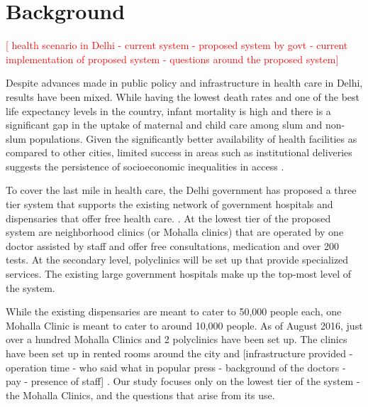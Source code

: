 \section{Background}
\begin{comment}
Build up the context that the reader could read, like a story, to understand more about the problem you’re addressing, the phenomena you are talking about. If the paper is about an internet ban in Bangladesh, tell the story about how the ban was put in place, what was the timeline like, who said what in popular press, and so on. If the research was conducted in the context of an organization of health/outreach workers, talk about the organization, its charter, what it has done/is doing.
\end{comment}

\textcolor{red}{ [
health scenario in Delhi - current system - proposed system by govt - current implementation of proposed system - questions around the proposed system]
}

Despite advances made in public policy and infrastructure in health care in Delhi, results have been mixed. While having the lowest death rates and one of the best life expectancy levels in the country, infant mortality is high and there is a significant gap in the uptake of maternal and child care among slum and non-slum populations. Given the significantly better availability of health facilities as compared to other cities, limited success in areas such as institutional deliveries suggests the persistence of socioeconomic inequalities in access \cite{mazumdar2015health}.

To cover the last mile in health care, the Delhi government has proposed a three tier system that supports the existing network of government hospitals and dispensaries that offer free health care. \cite{article}. At the lowest tier of the proposed system are neighborhood clinics (or Mohalla clinics) that are operated by one doctor assisted by staff and offer free consultations, medication and over 200 tests. At the secondary level, polyclinics will be set up that provide specialized services. The existing large government hospitals make up the top-most level of the system.

While the existing dispensaries are meant to cater to 50,000 people each, one Mohalla Clinic is meant to cater to around 10,000 people. As of August 2016, just over a hundred Mohalla Clinics and 2 polyclinics have been set up. The clinics have been set up in rented rooms around the city and [infrastructure provided - operation time -  who said what in popular press - background of the doctors - pay - presence of staff] \cite{articles}. Our study focuses only on the lowest tier of the system - the Mohalla Clinics, and the questions that arise from its use.